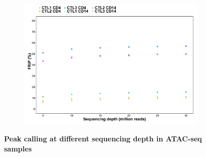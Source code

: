 \begin{figure}[htbp]
\begin{subfigure}{0.45\textwidth}
\includegraphics[width=\textwidth]{./Results1/pdfs/ATAC_Core_fresh_CD4_CD14_frac_reads_in_peaks_vs_depth}
\caption{\textbf{}}
\end{subfigure}
\caption[Peak calling and sequencing depth in ATAC-seq samples]{\textbf{Peak calling at different sequencing depth in ATAC-seq samples} \\
}
\label{fig:Peak_calling_versus_depth_ATAC}
\end{figure} 



